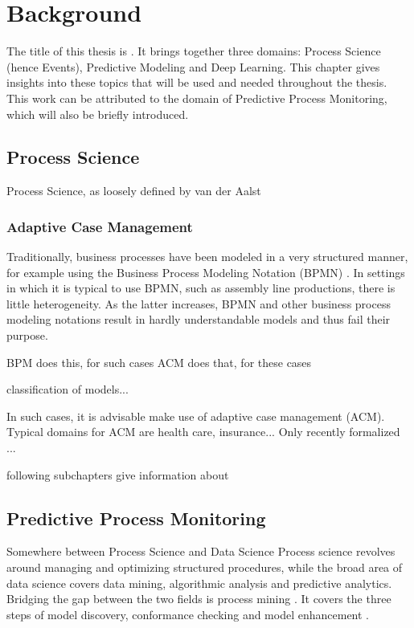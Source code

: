 \chapter{Background}\label{chap:background}
The title of this thesis is \textit{\thesisTitle}.
It brings together three domains: Process Science (hence Events), Predictive Modeling and Deep Learning.
This chapter gives insights into these topics that will be used and needed throughout the thesis.
This work can be attributed to the domain of Predictive Process Monitoring, which will also be briefly introduced.

\section{Process Science}
Process Science, as loosely defined by van der Aalst \cite{Aalst2016}

\subsection*{Adaptive Case Management}
Traditionally, business processes have been modeled in a very structured manner, for example using the Business Process Modeling Notation (BPMN) \cite{bpmn2.0}.
In settings in which it is typical to use BPMN, such as assembly line productions, there is little heterogeneity.
As the latter increases, BPMN and other business process modeling notations result in hardly understandable models and thus fail their purpose.

BPM does this, for such cases
ACM does that, for these cases

classification of models...

In such cases, it is advisable make use of adaptive case management (ACM). Typical domains for ACM are health care, insurance...
Only recently formalized \cite{hewelt2016}...

following subchapters give information about

\section{Predictive Process Monitoring}
Somewhere between Process Science and Data Science
Process science revolves around managing and optimizing structured procedures, while the broad area of data science covers data mining, algorithmic analysis and predictive analytics. 
Bridging the gap between the two fields is process mining \cite[p.18]{Aalst16}.
It covers the three steps of model discovery, conformance checking and model enhancement \cite{Aalst16}.

